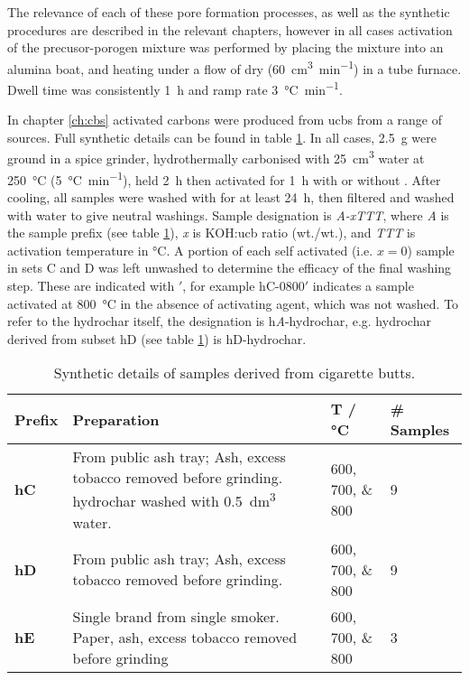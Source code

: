 The relevance of each of these pore formation processes, as well as the synthetic procedures are described in the relevant chapters, however in all cases activation of the precusor-\gls{porogen} mixture was performed by placing the mixture into an alumina boat, and heating under a flow of dry  (\qty{60}{\cm\cubed\per\minute}) in a tube furnace. Dwell time was consistently \qty{1}{\hour} and ramp rate \qty{3}{\degreeCelsius\per\minute}.

In chapter \ref{ch:cbs} activated carbons were produced from \glspl{ucb} from a range of sources. Full synthetic details can be found in table \ref{tb:cb_synthesis}. In all cases, \qty{2.5}{\gram}  were ground in a spice grinder, hydrothermally carbonised with \qty{25}{\cm\cubed} water at \qty{250}{\degreeCelsius} (\qty{5}{\degreeCelsius\per\minute}), held \qty{2}{\hour} then activated for \qty{1}{\hour} with or without . After cooling, all samples were washed with  for at least \qty{24}{\hour}, then filtered and washed with water to give neutral washings. Sample designation is \textit{A-xTTT}, where \textit{A} is the sample prefix (see table \ref{tb:cb_synthesis}), \textit{x} is KOH:\acrshort{ucb} ratio (wt./wt.), and \textit{TTT} is activation temperature in \unit{\degreeCelsius}. A portion of each self activated (i.e. $x = 0$) sample in sets C and D was left unwashed to determine the efficacy of the final washing step. These are indicated with $'$, for example hC-0800$'$ indicates a sample activated at \qty{800}{\degreeCelsius} in the absence of \gls{activating agent}, which was not washed. To refer to the \gls{hydrochar} itself, the designation is h\textit{A}-hydrochar, e.g. \gls{hydrochar} derived from subset hD (see table \ref{tb:cb_synthesis}) is hD-hydrochar.

\begin{table}[t]
    \caption{Synthetic details of samples derived from cigarette butts.}
    \label{tb:cb_synthesis}
    \begin{tabularx}{\textwidth}{lXXl}
        \toprule
            \textbf{Prefix} & \textbf{Preparation} & \textbf{T / \unit{\degreeCelsius}} & \textbf{\# Samples} \\ 
        \midrule
            \textbf{hC}     & From public ash tray; Ash, excess tobacco removed before grinding. \Gls{hydrochar} washed with \qty{0.5}{\dm\cubed} water.              & \numlist[list-final-separator={, }]{600;700;800} & 9              \\
            \textbf{hD}     &  From public ash tray; Ash, excess tobacco removed before grinding.             & \numlist[list-final-separator={, }]{600;700;800} & 9             \\
            \textbf{hE}     & Single brand from single smoker. Paper, ash, excess tobacco removed before grinding              & \numlist[list-final-separator={, }]{600;700;800} & 3              \\
        \bottomrule
    \end{tabularx}%
\end{table}

